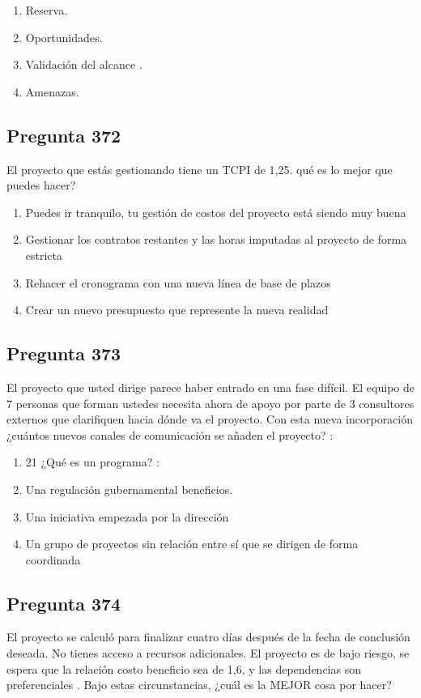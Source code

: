 \documentclass[11pt,a4paper]{article}
\begin{document}
\begin{enumerate}[label=\alph*)]
  \item Reserva.
  \item Oportunidades.
  \item Validación del alcance .
  \item Amenazas.
\end{enumerate}

\subsection*{Pregunta 372}
El proyecto que estás gestionando tiene un TCPI de 1,25. qué es lo mejor que puedes hacer?

\begin{enumerate}[label=\alph*)]
  \item Puedes ir tranquilo, tu gestión de costos del proyecto está siendo muy buena
  \item Gestionar los contratos restantes y las horas imputadas al proyecto de forma estricta
  \item Rehacer el cronograma con una nueva línea de base de plazos
  \item Crear un nuevo presupuesto que represente la nueva realidad
\end{enumerate}

\subsection*{Pregunta 373}
El proyecto que usted dirige parece haber entrado en una fase difícil. El equipo de 7 personas que forman ustedes necesita ahora de apoyo por parte de 3 consultores externos que clarifiquen hacia dónde va el proyecto. Con esta nueva incorporación ¿cuántos nuevos canales de comunicación se añaden el proyecto? :

\begin{enumerate}[label=\alph*)]
  \item 21 ¿Qué es un programa? :
  \item Una regulación gubernamental beneficios.
  \item Una iniciativa empezada por la dirección
  \item Un grupo de proyectos sin relación entre sí que se dirigen de forma coordinada
\end{enumerate}

\subsection*{Pregunta 374}
El proyecto se calculó para finalizar cuatro días después de la fecha de conclusión deseada. No tienes acceso a recursos adicionales. El proyecto es de bajo riesgo, se espera que la relación costo beneficio sea de 1,6, y las dependencias son preferenciales . Bajo estas circunstancias, ¿cuál es la MEJOR cosa por hacer?
\end{document}
